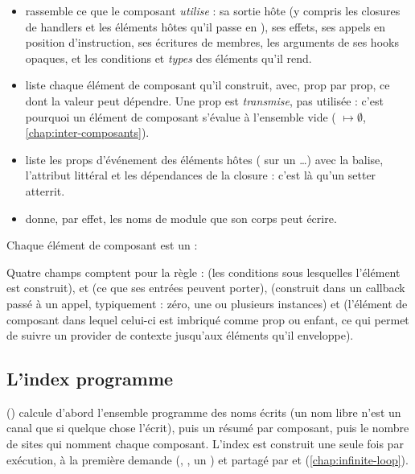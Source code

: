 \begin{itemize}
  \item {} rassemble ce que le composant \emph{utilise} : sa sortie hôte (y compris
        les closures de handlers et les éléments hôtes qu'il passe en ), ses effets,
        ses appels en position d'instruction, ses écritures de membres, les arguments de ses hooks
        opaques, et les conditions et \emph{types} des éléments qu'il rend.
  \item {} liste chaque élément de composant qu'il construit, avec, prop par prop, ce
        dont la valeur peut dépendre. Une prop est \emph{transmise}, pas utilisée : c'est pourquoi un
        élément de composant s'évalue à l'ensemble vide ( $\mapsto \emptyset$,
        \cref{chap:inter-composants}).
  \item {} liste les props d'événement des éléments hôtes ( sur un
        \dots) avec la balise, l'attribut  littéral et les dépendances de
        la closure : c'est là qu'un setter \og atterrit\fg{}.
  \item {} donne, par effet, les noms de module que son corps peut écrire.
\end{itemize}

Chaque élément de composant est un  :


Quatre champs comptent pour la règle :  (les conditions sous lesquelles l'élément est
construit),  et  (ce que ses entrées peuvent porter), 
(construit dans un callback passé à un appel, typiquement  : zéro, une ou plusieurs
instances) et  (l'élément de composant dans lequel celui-ci est imbriqué comme prop
ou enfant, ce qui permet de suivre un provider de contexte jusqu'aux éléments qu'il enveloppe).

\subsection{L'index programme}

 () calcule d'abord
l'ensemble programme des noms écrits (un nom libre n'est un canal que si quelque chose l'écrit),
puis un résumé  par composant, puis le nombre de sites qui nomment chaque
composant. L'index est construit une seule fois par exécution, à la première demande
(, , un ) et partagé
par  et  (\cref{chap:infinite-loop}).

